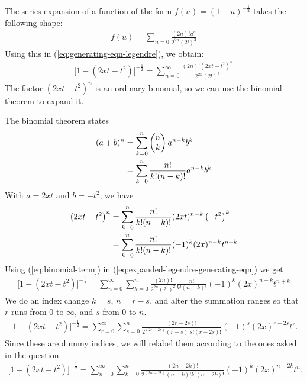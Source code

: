 \begin{enumerate}
    The series expansion of a function of the form $\displaystyle f(u)=(1-u)^{-\frac{1}{2}}$ takes the following shape:
    \begin{align}
        f(u)=\sum_{n=0}\frac{(2n)!u^n}{2^{2n}(2!)^2}
    \end{align}
    Using this in (\ref{eq:generating-eqn-legendre}), we obtain:
    \begin{align}
        \bigg[1-\left(2xt-t^2\right)\bigg]^{-\frac{1}{2}}=\sum_{n=0}^\infty\frac{(2n)!\left(2xt-t^2\right)^n}{2^{2n}(2!)^2}\label{eq:expanded-legendre-generating-eqn}
    \end{align}
    The factor $\displaystyle\left(2xt-t^2\right)^n$ is an ordinary binomial, so we can use the binomial theorem to expand it.

    The binomial theorem states
    \begin{align}
        (a+b)^n&=\sum_{k=0}^n\begin{pmatrix}
            n\\k
        \end{pmatrix}a^{n-k}b^k\notag\\
        &=\sum_{k=0}^n\frac{n!}{k!(n-k)!}a^{n-k}b^k
    \end{align}
    With $a=2xt$ and $b=-t^2$, we have
    \begin{align}
        \left(2xt-t^2\right)^n&=\sum_{k=0}^n\frac{n!}{k!(n-k)!}(2xt)^{n-k}\left(-t^2\right)^k\notag\\
        &=\sum_{k=0}^n\frac{n!}{k!(n-k)!}(-1)^k(2x)^{n-k}t^{n+k}\label{eq:binomial-term}
    \end{align}
    Using (\ref{eq:binomial-term}) in (\ref{eq:expanded-legendre-generating-eqn}) we get
    \begin{align}
        \bigg[1-\left(2xt-t^2\right)\bigg]^{-\frac{1}{2}}=\sum_{n=0}^\infty\sum_{k=0}^n\frac{(2n)!}{2^{2n}(2!)^2}\frac{n!}{k!(n-k)!}(-1)^k(2x)^{n-k}t^{n+k}
    \end{align}
    We do an index change $k=s$, $n=r-s$, and alter the summation ranges so that $r$ runs from $0$ to $\infty$, and $s$ from $0$ to $n$. 
    \begin{align}
        \bigg[1-\left(2xt-t^2\right)\bigg]^{-\frac{1}{2}}=\sum_{r=0}^\infty\sum_{s=0}^n\frac{\left(2r-2s\right)!}{2^{(2r-2s)}(r-s)!s!(r-2s)!}(-1)^s(2x)^{r-2s}t^r.
    \end{align}
    Since these are dummy indices, we will relabel them according to the ones asked in the question.
    \begin{align}
        \bigg[1-\left(2xt-t^2\right)\bigg]^{-\frac{1}{2}}=\sum_{n=0}^\infty\sum_{k=0}^n\frac{\left(2n-2k\right)!}{2^{(2n-2k)}(n-k)!k!(n-2k)!}(-1)^k(2x)^{n-2k}t^n.\label{eq:chosen-one}

\end{align}
\end{enumerate}
